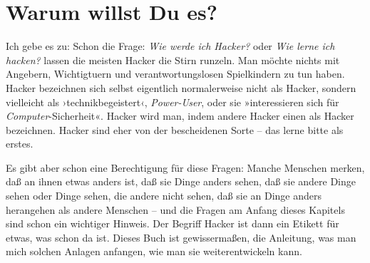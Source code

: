 \section{Warum willst Du es?}

Ich gebe es zu: Schon die Frage: \emph{Wie werde ich Hacker?} oder \emph{Wie lerne ich hacken?} lassen die meisten Hacker die Stirn runzeln. Man möchte nichts mit Angebern, Wichtigtuern und verantwortungslosen Spielkindern zu tun haben. Hacker bezeichnen sich selbst eigentlich normalerweise nicht als Hacker, sondern vielleicht als ›technikbegeistert‹, \emph{Power-User}, oder sie »interessieren sich für \emph{Computer}-Sicherheit«. Hacker wird man, indem andere Hacker einen als Hacker bezeichnen. Hacker sind eher von der bescheidenen Sorte – das lerne bitte als erstes.

Es gibt aber schon eine Berechtigung für diese Fragen: Manche Menschen merken, daß an ihnen etwas anders ist, daß sie Dinge anders sehen, daß sie andere Dinge sehen oder Dinge sehen, die andere nicht sehen, daß sie an Dinge anders herangehen als andere Menschen – und die Fragen am Anfang dieses Kapitels sind schon ein wichtiger Hinweis. Der Begriff Hacker ist dann ein Etikett für etwas, was schon da ist. Dieses Buch ist gewissermaßen, die Anleitung, was man mich solchen Anlagen anfangen, wie man sie weiterentwickeln kann.